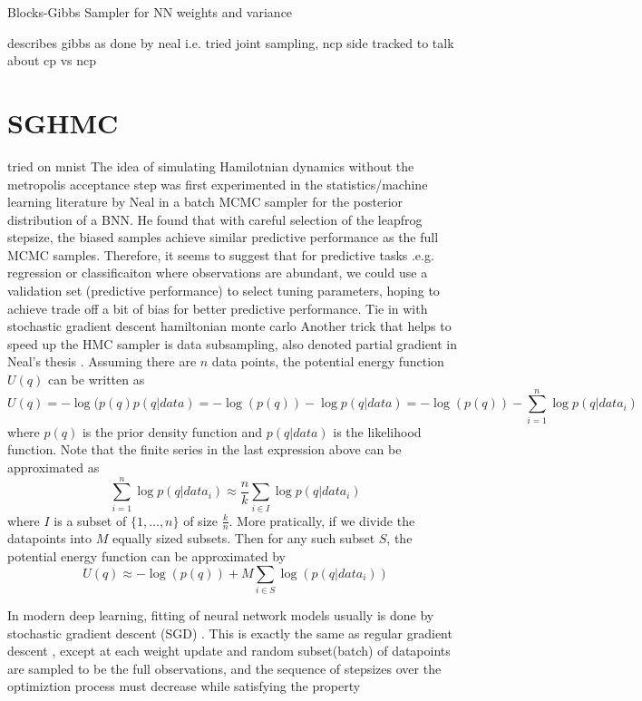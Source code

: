 \documentclass[]{report}
\begin{document}
\begin{algorithm}

\caption{Blocks-Gibbs Sampler for NN weights and variance}
\end{algorithm}



describes gibbs as done by neal 
i.e. tried joint sampling, ncp 
side tracked to talk about cp vs ncp 
\section{SGHMC}
tried on mnist
The idea of simulating Hamilotnian dynamics without the metropolis acceptance step was first experimented in the statistics/machine learning literature by Neal \cite{neal1993bayesian} in a batch MCMC sampler for the posterior distribution of a BNN. He found that with careful selection of the leapfrog stepsize, the biased samples achieve similar predictive performance as the full MCMC samples. Therefore, it seems to suggest that for predictive tasks .e.g. regression or classificaiton where observations are abundant, we could 
use a validation set (predictive performance) to select tuning parameters, hoping to achieve trade off a bit of bias for better predictive performance. 
Tie in with stochastic gradient descent hamiltonian monte carlo
Another trick that helps to speed up the HMC sampler is data subsampling, also denoted partial gradient in Neal's thesis \cite{neal2012bayesian}.
Assuming there are $n$ data points, the potential energy function $U(q)$ can be written as 
\[ U(q) = -\log( p(q) p(q|data) = -\log(p(q)) -\log p(q|data) = -\log(p(q)) - \sum_{i=1}^n \log p(q|data_i) \]
where $p(q)$ is the prior density function and $p(q|data)$ is the likelihood function. Note that the finite series in the last expression above can be approximated as 
\[ \sum_{i=1}^n \log p(q|data_i) \approx \frac{n}{k} \sum_{i \in I} \log p(q|data_i) \]
where $I$ is a subset of $\{1,\dots, n\}$ of size $\frac{k}{n}$. 
More pratically, if we divide the datapoints into $M$ equally sized subsets. Then for any such subset $S$, the potential energy function can be approximated by 
\[ U(q) \approx    -\log(p(q)) + M \sum_{i \in S} \log(p(q|data_i)) \]


In modern deep learning, fitting of neural network models usually is done by stochastic gradient descent (SGD) \cite{ngiam2011optimization}.
This is exactly the same as regular gradient descent \cite{wright1999numerical}, except at each weight update and random subset(batch) of datapoints are sampled to be the full observations, and the sequence of stepsizes over the optimiztion process must decrease while satisfying the property
\end{document}
